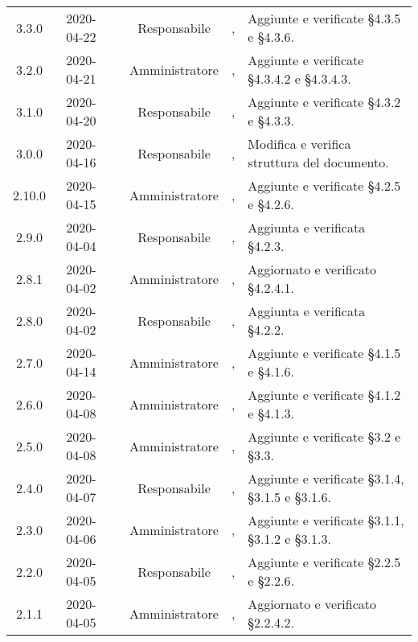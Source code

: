 {\begin{longtable}{ c c  C{2.3cm} c C{3cm} C{3.2cm}}
3.3.0 & 2020-04-22 & \LD{} & Responsabile &  \AT{}, \PF{} & Aggiunte e verificate §4.3.5 e §4.3.6.  \\

3.2.0 & 2020-04-21 & \SE{} & Amministratore &  \AT{}, \PF{} & Aggiunte e verificate §4.3.4.2 e §4.3.4.3.  \\

3.1.0 & 2020-04-20 & \LD{} & Responsabile &  \AT{}, \PF{} & Aggiunte e verificate §4.3.2 e §4.3.3.  \\

3.0.0 & 2020-04-16 & \DF{} & Responsabile &  \AT{}, \PF{} & Modifica e verifica struttura del documento.  \\

2.10.0 & 2020-04-15 & \BR{} & Amministratore &  \AT{}, \PF{} & Aggiunte e verificate §4.2.5 e §4.2.6.  \\

2.9.0 & 2020-04-04 & \LD{} & Responsabile &  \AT{}, \PF{} & Aggiunta e verificata  §4.2.3.  \\

2.8.1 & 2020-04-02 & \SE{} & Amministratore &  \AT{}, \PF{} & Aggiornato e verificato §4.2.4.1.  \\

2.8.0 & 2020-04-02 & \LD{} & Responsabile &  \AT{}, \PF{} & Aggiunta e verificata §4.2.2.  \\

2.7.0 & 2020-04-14 & \SE{} & Amministratore &  \AT{}, \PF{} & Aggiunte e verificate §4.1.5 e §4.1.6.  \\

2.6.0 & 2020-04-08 & \BR{} & Amministratore &  \AT{}, \PF{} & Aggiunte e verificate §4.1.2 e §4.1.3.  \\

2.5.0 & 2020-04-08 & \SE{} & Amministratore &  \AT{}, \PF{} & Aggiunte e verificate §3.2 e §3.3.  \\

2.4.0 & 2020-04-07 & \LD{} & Responsabile &  \AT{}, \PF{} & Aggiunte e verificate §3.1.4, §3.1.5 e §3.1.6.  \\

2.3.0 & 2020-04-06 & \SE{} & Amministratore &  \AT{}, \PF{} & Aggiunte e verificate §3.1.1, §3.1.2 e §3.1.3.  \\

2.2.0 & 2020-04-05 & \LD{} & Responsabile &  \AT{}, \PF{} & Aggiunte e verificate §2.2.5 e §2.2.6.  \\

2.1.1 & 2020-04-05 & \BR{} & Amministratore &  \AT{}, \PF{} & Aggiornato e verificato §2.2.4.2.  \\


\end{longtable}}
